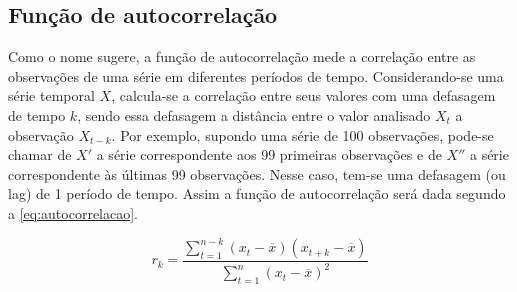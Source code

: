 \documentclass[
    12pt,
    oneside,
    a4paper,
    english,
    brazil
]{abntex2}
\begin{document}
\subsection{Função de autocorrelação}\label{sec:corre}
Como o nome sugere, a função de autocorrelação mede a correlação entre as observações de uma série em diferentes períodos de tempo. Considerando-se uma série temporal $X$, calcula-se a correlação entre seus valores com uma defasagem de tempo $k$, sendo essa defasagem a distância entre o valor analisado $X_t$ a observação $X_{t-k}$. Por exemplo, supondo uma série de 100 observações, pode-se chamar de $X'$ a série correspondente aos 99 primeiras observações e de $X''$ a série correspondente às últimas 99 observações. Nesse caso, tem-se uma defasagem (ou lag) de 1 período de tempo. Assim a função de autocorrelação será dada segundo a \autoref{eq:autocorrelacao}.



\begin{equation}
    \label{eq:autocorrelacao}
    r_k = \frac{\sum_{t=1}^{n-k}{(x_t - \overline{x})(x_{t+k} -
    \overline{x})}}{\sum_{t=1}^{n}{(x_t - \overline{x})^2}}
\end{equation}
\end{document}
